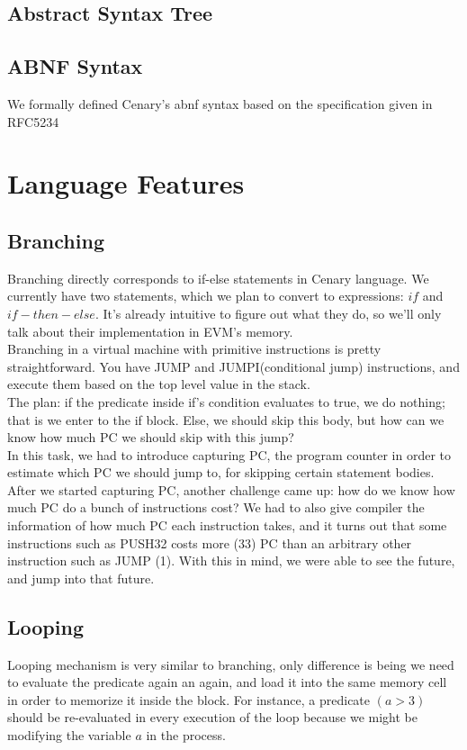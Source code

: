 \documentclass{article}
\begin{document}
\subsection{Abstract Syntax Tree}
\label{subsec:ast}

\subsection{ABNF Syntax}
We formally defined Cenary's abnf syntax based on the specification given in RFC5234\cite{rfc_5234}
\label{subsec:abnf_syntax}

\newpage
\section{Language Features}
\subsection{Branching}
Branching directly corresponds to if-else statements in Cenary language. We currently have two statements, which we plan to convert to expressions: $if$ and $if-then-else$. It's already intuitive to figure out what they do, so we'll only talk about their implementation in EVM's memory. \\

Branching in a virtual machine with primitive instructions is pretty straightforward. You have JUMP and JUMPI(conditional jump) instructions, and execute them based on the top level value in the stack. \\

The plan: if the predicate inside if's condition evaluates to true, we do nothing; that is we enter to the if block. Else, we should skip this body, but how can we know how much PC we should skip with this jump? \\

In this task, we had to introduce capturing PC, the program counter in order to estimate which PC we should jump to, for skipping certain statement bodies. After we started capturing PC, another challenge came up: how do we know how much PC do a bunch of instructions cost? We had to also give compiler the information of how much PC each instruction takes, and it turns out that some instructions such as PUSH32 costs more (33) PC than an arbitrary other instruction such as JUMP (1). With this in mind, we were able to see the future, and jump into that future.

\subsection{Looping}
Looping mechanism is very similar to branching, only difference is being we need to evaluate the predicate again an again, and load it into the same memory cell in order to memorize it inside the block. For instance, a predicate $(a > 3)$ should be re-evaluated in every execution of the loop because we might be modifying the variable $a$ in the process. \\
\end{document}
